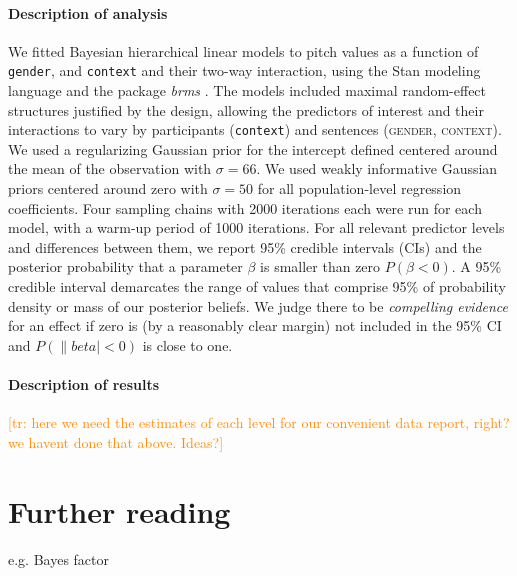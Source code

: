\documentclass[nobib]{tufte-handout}
\newcommand{\tr}[1]{\textcolor{DarkOrange}{[tr: #1]}}
\begin{document}
\paragraph{Description of analysis}  
We fitted Bayesian hierarchical linear models to pitch values as a function of \texttt{gender}, and \texttt{context} and their two-way interaction, using the Stan modeling language \citep{carpenter2016stan} and the package \emph{brms} \citep{buerkner2016brms}.
The models included maximal random-effect structures justified by the design, allowing the predictors of interest and their interactions to vary by participants (\texttt{context}) and sentences (\textsc{gender}, \textsc{context}).
We used a regularizing Gaussian prior for the intercept defined centered around the mean of the observation with  \(\sigma = 66\). We used weakly informative Gaussian priors centered around zero with \(\sigma = 50\) for all population-level regression coefficients.  Four sampling chains with 2000 iterations each were run for each model, with a warm-up period of 1000 iterations. 
For all relevant predictor levels and differences between them, we report 95\% credible
intervals (CIs) and the posterior probability that a parameter $\beta$ is smaller than zero $P(\beta < 0)$. A 95\% credible interval demarcates the range of values that comprise 95\% of probability density or mass of our posterior beliefs. We judge there to be \emph{compelling evidence
} for an effect if zero is (by a reasonably clear margin) not included in the 95\% CI and $P(\|beta| < 0)$ is close to one.

\paragraph{Description of results}  
\tr{here we need the estimates of each level for our convenient data report, right? we havent done that above. Ideas?}


\section{Further reading}
e.g. Bayes factor





\printbibliography[heading=bibintoc]
\end{document}
